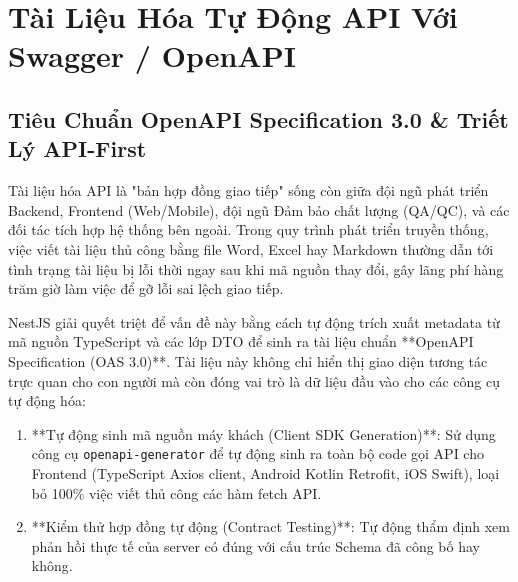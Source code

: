 \documentclass[12pt,a4paper,oneside]{book}
\begin{document}
\chapter{Tài Liệu Hóa Tự Động API Với Swagger / \mbox{OpenAPI}}

\section{Tiêu Chuẩn OpenAPI Specification 3.0 \& Triết Lý API-First}
Tài liệu hóa API là "bản hợp đồng giao tiếp" sống còn giữa đội ngũ phát triển Backend, Frontend (Web/Mobile), đội ngũ Đảm bảo chất lượng (QA/QC), và các đối tác tích hợp hệ thống bên ngoài. Trong quy trình phát triển truyền thống, việc viết tài liệu thủ công bằng file Word, Excel hay Markdown thường dẫn tới tình trạng tài liệu bị lỗi thời ngay sau khi mã nguồn thay đổi, gây lãng phí hàng trăm giờ làm việc để gỡ lỗi sai lệch giao tiếp.

NestJS giải quyết triệt để vấn đề này bằng cách tự động trích xuất metadata từ mã nguồn TypeScript và các lớp DTO để sinh ra tài liệu chuẩn **OpenAPI Specification (OAS 3.0)**. Tài liệu này không chỉ hiển thị giao diện tương tác trực quan cho con người mà còn đóng vai trò là dữ liệu đầu vào cho các công cụ tự động hóa:
\begin{enumerate}
  \item **Tự động sinh mã nguồn máy khách (Client SDK Generation)**: Sử dụng công cụ \texttt{openapi-generator} để tự động sinh ra toàn bộ code gọi API cho Frontend (TypeScript Axios client, Android Kotlin Retrofit, iOS Swift), loại bỏ 100\% việc viết thủ công các hàm fetch API.
  \item **Kiểm thử hợp đồng tự động (Contract Testing)**: Tự động thẩm định xem phản hồi thực tế của server có đúng với cấu trúc Schema đã công bố hay không.
\end{enumerate}
\end{document}
